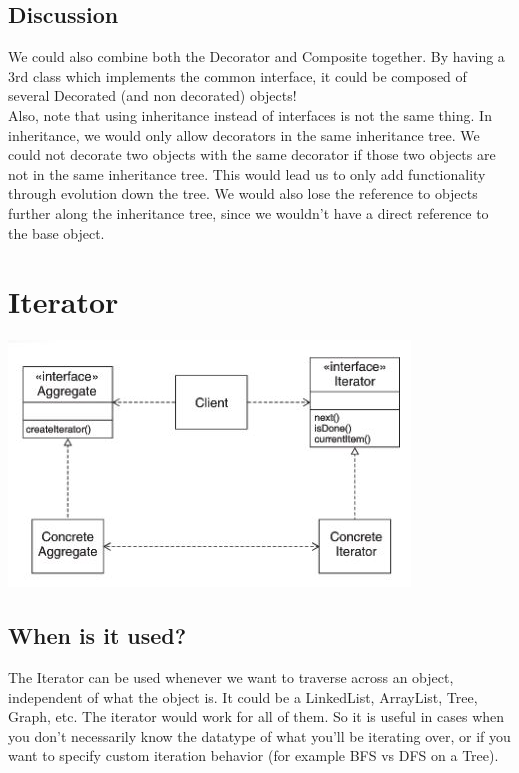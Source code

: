 \documentclass[12pt]{article}
\theoremstyle{definition}
\begin{document}
\subsection{Discussion}
We could also combine both the Decorator and Composite together. By having a 3rd class which implements the common interface, it could be composed of several Decorated (and non decorated) objects!
\\ \linebreak
Also, note that using inheritance instead of interfaces is not the same thing. In inheritance, we would only allow decorators in the same inheritance tree. We could not decorate two objects with the same decorator if those two objects are not in the same inheritance tree. This would lead us to only add functionality through evolution down the tree. 
We would also lose the reference to objects further along the inheritance tree, since we wouldn't have a direct reference to the base object. 
\\ \linebreak

\section{Iterator}
\includegraphics{iterator}\\
\subsection{When is it used?}
The Iterator can be used whenever we want to traverse across an object, independent of what the object is. It could be a LinkedList, ArrayList, Tree, Graph, etc. The iterator would work for all of them. So it is useful in cases when you don't necessarily know the datatype of what you'll be iterating over, or if you want to specify custom iteration behavior (for example BFS vs DFS on a Tree). 
\\ \linebreak
\end{document}
